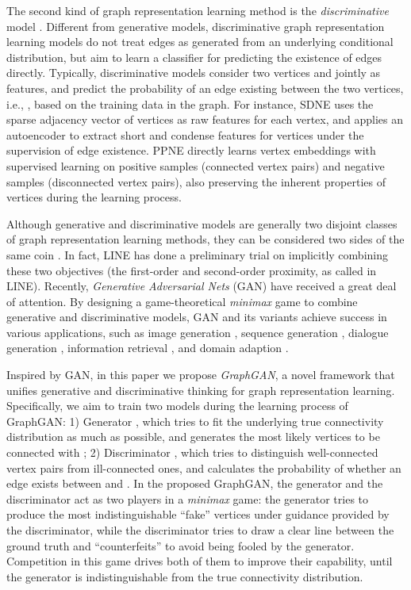 \documentclass[letterpaper]{article}
\begin{document}
	The second kind of graph representation learning method is the \textit{discriminative} model \cite{wang2018shine,cao2016deep,wang2016structural,li2017ppne}.
	Different from generative models, discriminative graph representation learning models do not treat edges as generated from an underlying conditional distribution, but aim to learn a classifier for predicting the existence of edges directly.
	Typically, discriminative models consider two vertices  and  jointly as features, and predict the probability of an edge existing between the two vertices, i.e., , based on the training data in the graph.
	For instance, SDNE \cite{wang2016structural} uses the sparse adjacency vector of vertices as raw features for each vertex, and applies an autoencoder to extract short and condense features for vertices under the supervision of edge existence.
	PPNE \cite{li2017ppne} directly learns vertex embeddings with supervised learning on positive samples (connected vertex pairs) and negative samples (disconnected vertex pairs), also preserving the inherent properties of vertices during the learning process.
	
	Although generative and discriminative models are generally two disjoint classes of graph representation learning methods, they can be considered two sides of the same coin \cite{wang2017irgan}.
	In fact, LINE \cite{tang2015line} has done a preliminary trial on implicitly combining these two objectives (the first-order and second-order proximity, as called in LINE).
	Recently, \textit{Generative Adversarial Nets} (GAN) \cite{goodfellow2014generative} have received a great deal of attention.
	By designing a game-theoretical \textit{minimax} game to combine generative and discriminative models, GAN and its variants achieve success in various applications, such as image generation \cite{denton2015deep}, sequence generation \cite{yu2017seqgan}, dialogue generation \cite{li2017adversarial}, information retrieval \cite{wang2017irgan}, and domain adaption \cite{zhang2017aspect}.
	
	Inspired by GAN, in this paper we propose \textit{GraphGAN}, a novel framework that unifies generative and discriminative thinking for graph representation learning.
	Specifically, we aim to train two models during the learning process of GraphGAN:
	1) Generator , which tries to fit the underlying true connectivity distribution  as much as possible, and generates the most likely vertices to be connected with ;
	2) Discriminator , which tries to distinguish well-connected vertex pairs from ill-connected ones, and calculates the probability of whether an edge exists between  and .
	In the proposed GraphGAN, the generator  and the discriminator  act as two players in a \textit{minimax} game:
	the generator tries to produce the most indistinguishable ``fake'' vertices under guidance provided by the discriminator, while the discriminator tries to draw a clear line between the ground truth and ``counterfeits'' to avoid being fooled by the generator.
	Competition in this game drives both of them to improve their capability, until the generator is indistinguishable from the true connectivity distribution.
	
\end{document}
